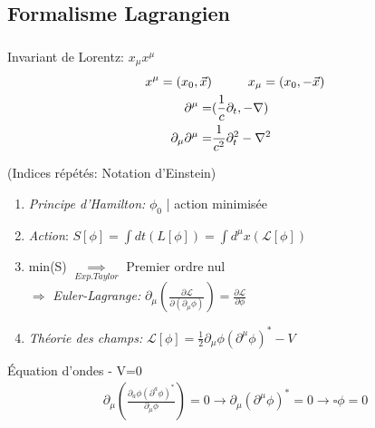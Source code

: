 \documentclass[handout]{beamer}
\begin{document}
\subsection{Formalisme Lagrangien}
\begin{frame}

\frametitle{}
\begin{block}{}
Invariant de Lorentz: $x_\mu x^\mu$
\begin{align*}
x^\mu = (x_0,\vec{x}) &\hspace{1 cm} x_\mu = (x_0,-\vec{x})\\
\partial^\mu =& (\frac{1}{c} \partial_t, -\nabla) \\
\partial_\mu \partial^\mu =& \frac{1}{c^2} \partial_t^2- \nabla^2 
\end{align*}

\end{block}
(Indices répétés: Notation d'Einstein)

\end{frame}

\begin{frame}
\begin{enumerate}
\item \textit{Principe d'Hamilton:} $\phi_0$ | action minimisée \\
\item \textit{Action}: $S[\phi] = \int{dt (L[\phi])}  =  \int{d^{\mu}x (\mathcal{L}[\phi])}$\\[0.5 cm]
\item min(S) $\underset{Exp. Taylor}{\implies}$ Premier ordre nul \\
$\Rightarrow$ \textit{Euler-Lagrange:} $\partial_\mu \left(\frac{\partial\mathcal{L}}{\partial(\partial_\mu\phi)}\right) = \frac{\partial\mathcal{L}}{\partial\phi}$\\[0.5 cm]
\item  \textit{Théorie des champs:} $\mathcal{L}[\phi] = \frac{1}{2} \partial_\mu \phi (\partial^\mu \phi)^* -V$

\end{enumerate}
\begin{exampleblock}{Équation d'ondes - V=0}
\begin{align*}
 \partial_\mu(\frac{\partial_a\phi (\partial^a\phi)^* }{\partial_\mu \phi}) = 0 \rightarrow
\partial_\mu (\partial^\mu \phi)^*  = 0 \rightarrow
 \square \phi = 0 \\
\end{align*}
\end{exampleblock}
\end{frame}
\end{document}

